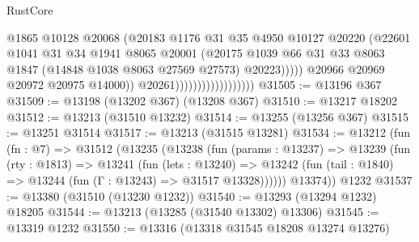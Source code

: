 \begin{lexlean}{RustCore}
\begin{coremodule}
                                                @1865
                                                @10128
                                                @20068
                                                (@20183
                                                  @1176
                                                  @31
                                                  @35
                                                  @4950
                                                  @10127
                                                  @20220
                                                  (@22601
                                                    @1041
                                                    @31
                                                    @34
                                                    @1941
                                                    @8065
                                                    @20001
                                                    (@20175
                                                      @1039
                                                      @66
                                                      @31
                                                      @33
                                                      @8063
                                                      @1847
                                                      (@14848 @1038 @8063 @27569 @27573)
                                                      @20223)))))
                                            @20966
                                            @20969
                                            @20972
                                            @20975
                                            @14000))
                                        @20261))))))))))))))))))
@31505 := @13196 @367
@31509 := @13198 (@13202 @367) (@13208 @367)
@31510 := @13217 @18202
@31512 := @13213 (@31510 @13232)
@31514 := @13255 (@13256 @367)
@31515 := @13251 @31514
@31517 := @13213 (@31515 @13281)
@31534 := @13212
    (fun (fn : @7) =>
    @31512
      (@13235
        (@13238
          (fun (params : @13237) =>
          @13239
            (fun (rty : @1813) =>
            @13241
              (fun (lets : @13240) =>
              @13242 (fun (tail : @1840) => @13244 (fun (Γ : @13243) => @31517 @13328))))))
        @13374))
    @1232
@31537 := @13380 (@31510 (@13230 @1232))
@31540 := @13293 (@13294 @1232) @18205
@31544 := @13213 (@13285 (@31540 @13302) @13306)
@31545 := @13319 @1232
@31550 := @13316 (@13318 @31545 @18208 @13274 @13276)

\end{coremodule}
\end{lexlean}
